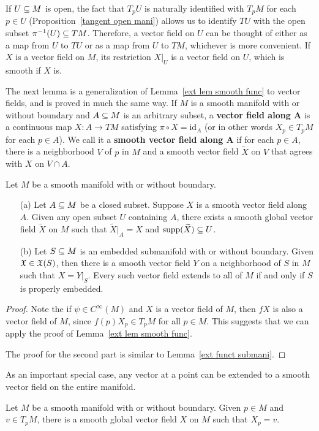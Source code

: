 If $U\subseteq M$ is open, the fact that $T_pU$ is naturally identified with $T_pM$ for each $p\in U$ (Proposition~\ref{tangent open mani}) allows us to identify $TU$ with the open subset $\pi^{-1}(U)\subseteq TM$. Therefore, a vector field on $U$ can be thought of either as a map from $U$ to $TU$ or as a map from $U$ to $TM$, whichever is more convenient. If $X$ is a vector field on $M$, its restriction $X|_U$ is a vector field on $U$, which is smooth if $X$ is.\par
The next lemma is a generalization of Lemma~\ref{ext lem smooth func} to vector fields, and is proved in much the same way. If $M$ is a smooth manifold with or without boundary and $A\subseteq M$ is an arbitrary subset, a \textbf{vector field along $\bm{A}$} is a continuous map $X:A\to TM$ satisfying $\pi\circ X=\mathrm{id}_A$ (or in other words $X_p\in T_pM$ for each $p\in A$). We call it a \textbf{smooth vector field along $\bm{A}$} if for each $p\in A$, there is a neighborhood $V$ of $p$ in $M$ and a smooth vector field $\widetilde{X}$ on $V$ that agrees with $X$ on $V\cap A$.
\begin{lemma}
Let $M$ be a smooth manifold with or without boundary.
\begin{itemize}
\item[(a)] Let $A\subseteq M$ be a closed subset. Suppose $X$ is a smooth vector field along $A$. Given any open subset $U$ containing $A$, there exists a smooth global vector field $\widetilde{X}$ on $M$ such that $\widetilde{X}|_A=X$ and $\mathrm{supp}(\widetilde{X})\subseteq U$.
\item[(b)] Let $S\subseteq M$ is an embedded submanifold with or without boundary. Given $\mathfrak{X}\in\mathfrak{X}(S)$, then there is a smooth vector field $Y$ on a neighborhood of $S$ in $M$ such that $X=Y|_S$. Every such vector field extends to all of $M$ if and only if $S$ is properly embedded.
\end{itemize}
\end{lemma}
\begin{proof}
Note the if $\psi\in C^\infty(M)$ and $X$ is a vector field of $M$, then $fX$ is also a vector field of $M$, since $f(p)X_p\in T_pM$ for all $p\in M$. This suggests that we can apply the proof of Lemma~\ref{ext lem smooth func}.\par
The proof for the second part is similar to Lemma~\ref{ext funct submani}.
\end{proof}
As an important special case, any vector at a point can be extended to a smooth
vector field on the entire manifold.
\begin{proposition}
Let $M$ be a smooth manifold with or without boundary. Given $p\in M$ and $v\in T_pM$, there is a smooth global vector field $X$ on $M$ such that $X_p=v$.
\end{proposition}
